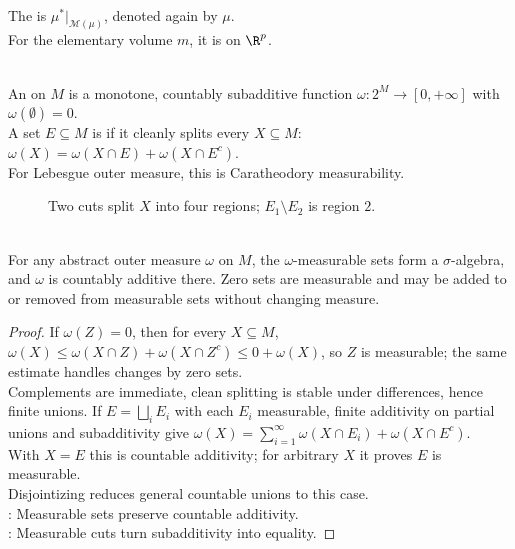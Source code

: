 \begin{definition} \label{def:extended-and-lebesgue-measure} \\
The  is $\mu^\ast|_{\mathcal{M}(\mu)}$, denoted again by $\mu$.\\
For the elementary volume $m$, it is  on $\R^p$.
\end{definition}

\begin{definition} \label{def:abstract-outer-measure-clean-division} \\
An  on $M$ is a monotone, countably subadditive function $\omega:2^M\to[0,+\infty]$ with $\omega(\emptyset)=0$.\\
A set $E\subseteq M$ is  if it cleanly splits every $X\subseteq M$: $\omega(X)=\omega(X\cap E)+\omega(X\cap E^c)$.\\
For Lebesgue outer measure, this is Caratheodory measurability.
\end{definition}

\begin{figure}[H]
  \centering
  
  \caption{Two cuts split $X$ into four regions; $E_1\setminus E_2$ is region $2$.}
  \label{fig:measurable-difference-four-regions}
\end{figure}

\begin{theorem} \label{thm:caratheodory-measurable-sets-sigma-algebra} \\
For any abstract outer measure $\omega$ on $M$, the $\omega$-measurable sets form a $\sigma$-algebra, and $\omega$ is countably additive there. Zero sets are measurable and may be added to or removed from measurable sets without changing measure.
\begin{proof}
If $\omega(Z)=0$, then for every $X\subseteq M$, $\omega(X)\leq\omega(X\cap Z)+\omega(X\cap Z^c)\leq0+\omega(X)$, so $Z$ is measurable; the same estimate handles changes by zero sets.\\
Complements are immediate, clean splitting is stable under differences, hence finite unions. If $E=\bigsqcup_iE_i$ with each $E_i$ measurable, finite additivity on partial unions and subadditivity give $\omega(X)=\sum\limits_{i=1}^{\infty}\omega(X\cap E_i)+\omega(X\cap E^c)$.\\
With $X=E$ this is countable additivity; for arbitrary $X$ it proves $E$ is measurable.\\
Disjointizing reduces general countable unions to this case.\\
: Measurable sets preserve countable additivity.\\
: Measurable cuts turn subadditivity into equality.
\end{proof}
\end{theorem}


